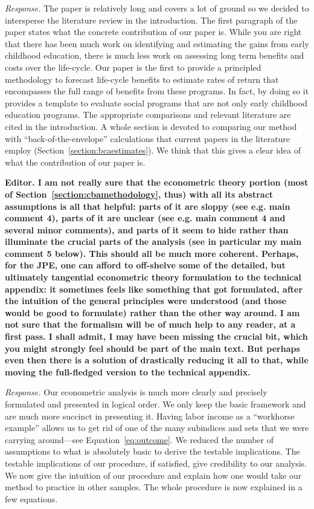 \noindent \textit{Response.} The paper is relatively long and covers a lot of ground so we decided to intersperse the literature review in the introduction. The first paragraph of the paper states what the concrete contribution of our paper is. While you are right that there has been much work on identifying and estimating the gains from early childhood education, there is much less work on assessing long term benefits and costs over the life-cycle. Our paper is the first to provide a principled methodology to forecast life-cycle benefits to estimate rates of return that encompasses the full range of benefits from these programs. In fact, by doing so it provides a template to evaluate social programs that are not only early childhood education programs. The appropriate comparisons and relevant literature are cited in the introduction. A whole section is devoted to comparing our method with ``back-of-the-envelope'' calculations that current papers in the literature employ (Section~\ref{section:bcaestimates}). We think that this gives a clear idea of what the contribution of our paper is.

\noindent \textbf{Editor. I am not really sure that the econometric theory portion (most of Section~\ref{section:cbamethodology}, thus) with all its abstract assumptions is all that helpful: parts of it are sloppy (see e.g. main comment 4), parts of it are unclear (see e.g. main comment 4 and several minor comments), and parts of it seem to hide rather than illuminate the crucial parts of the analysis (see in particular my main comment 5 below). This should all be much more coherent. Perhaps, for the JPE, one can afford to off-shelve some of the detailed, but ultimately tangential econometric theory formulation to the technical appendix: it sometimes feels like something that got formulated, after the intuition of the general principles were understood (and those would be good to formulate) rather than the other way around. I am not sure that the formalism will be of much help to any reader, at a first pass. I shall admit, I may have been missing the crucial bit, which you might strongly feel should be part of the main text. But perhaps even then there is a solution of drastically reducing it all to that, while moving the full-fledged version to the technical appendix.}

\noindent \textit{Response.} Our econometric analysis is much more clearly and precisely formulated and presented in logical order. We only keep the basic framework and are much more succinct in presenting it. Having labor income as a ``workhorse example'' allows us to get rid of one of the many subindices and sets that we were carrying around---see Equation~\eqref{eq:outcome}. We reduced the number of assumptions to what is absolutely basic to derive the testable implications. The testable implications of our procedure, if satisfied, give credibility to our analysis. We now give the intuition of our procedure and explain how one would take our method to practice in other samples. The whole procedure is now explained in a few equations.

